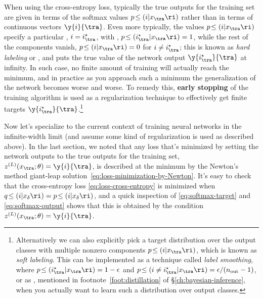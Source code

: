When using the cross-entropy loss, typically the true outputs for the training set are given in terms of the softmax values $p\!\le(i|x_{\tra}\ri)$ rather than in terms of continuous vectors $\y{i}{\tra}$. Even more typically, the values $p\!\le(i|x_{\tra}\ri)$ specify a particular , $i=i^\star_{\tra}$, with , $p\!\le(i^\star_{\tra}|x_{\tra}\ri) = 1$, while the rest of the components vanish, $p\!\le(i|x_{\tra}\ri) = 0$ for $i\neq i^\star_{\tra}$; this is known  as \emph{hard labeling} or , and puts the true value of the network output $\y{i^\star_{\tra}}{\tra}$ at infinity. In such case, no finite amount of training will actually reach the minimum, 
and in practice as you approach such a minimum the generalization of the network becomes worse and worse. To remedy this, \textbf{early stopping} of the training algorithm is used as a regularization technique to effectively get finite targets $\y{i^\star_{\tra}}{\tra}$.\footnote{Alternatively we can also explicitly pick a target distribution over the output classes with multiple nonzero components $p\!\le(i|x_{\tra}\ri)$, which is known as \emph{soft labeling}. This can be implemented as a  technique called \emph{label smoothing}, where $p\!\le(i^\star_{\tra}|x_{\tra}\ri) = 1-\epsilon$ and $p\!\le(i\ne i^\star_{\tra}|x_{\tra}\ri) = \epsilon/(n_{\text{out}}-1)$, or as  , mentioned in footnote~\ref{foot:distillation} of \S\ref{ch:bayesian-inference}, when you actually want to learn such a distribution over output classes.}



Now let's specialize to the current context of training neural networks in the infinite-width limit (and assume some kind of regularization is used as described above). In the last section, we noted that any loss that's minimized by setting the network outputs to the true outputs for the training set, $z^{(L)}(x_{\tra};\theta)=\y{i}{\tra}$, is described at the minimum by the Newton's method giant-leap solution~\eqref{eq:loss-minimization-by-Newton}. It's easy to check that the cross-entropy loss \eqref{eq:loss-cross-entropy} is minimized when $ q\!\le(i|x_\delta\ri)  = p\!\le(i|x_\delta\ri)$, and a quick inspection of \eqref{eq:softmax-target} and \eqref{eq:softmax-output} shows that this is obtained by the condition $z^{(L)}(x_{\tra};\theta)=\y{i}{\tra}$.

